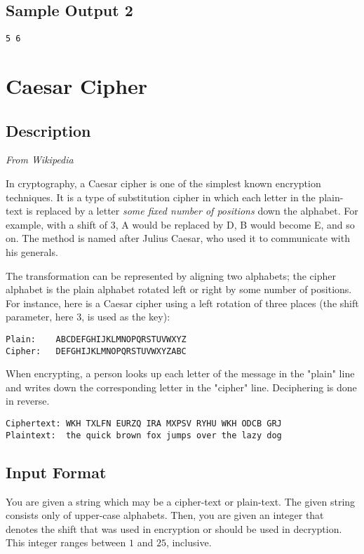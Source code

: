 \subsection*{Sample Output 2}
\begin{verbatim}
5 6
\end{verbatim}



\newpage

\section{Caesar Cipher}
\subsection*{Description}
\textit{From Wikipedia} 

In cryptography, a Caesar cipher is one of the simplest known encryption techniques.  It is a type of substitution cipher in which each letter in the plain-text is replaced by a letter \textit{some fixed number of positions} down the alphabet. For example, with a shift of $3$, A would be replaced by D, B would become E, and so on. The method is named after Julius Caesar, who used it to communicate with his generals.


The transformation can be represented by aligning two alphabets; the cipher alphabet is the plain alphabet rotated left or right by some number of positions. For instance, here is a Caesar cipher using a left rotation of three places (the shift parameter, here 3, is used as the key):
\begin{verbatim}
Plain:    ABCDEFGHIJKLMNOPQRSTUVWXYZ
Cipher:   DEFGHIJKLMNOPQRSTUVWXYZABC
\end{verbatim}

When encrypting, a person looks up each letter of the message in the "plain" line and writes down the corresponding letter in the "cipher" line. Deciphering is done in reverse.
\begin{verbatim}
Ciphertext: WKH TXLFN EURZQ IRA MXPSV RYHU WKH ODCB GRJ
Plaintext:  the quick brown fox jumps over the lazy dog
\end{verbatim}

\subsection*{Input Format}
You are given a string which may be a cipher-text or plain-text. The given string consists only of upper-case alphabets.  Then, you are given an integer that denotes the shift that was used in encryption or should be used in decryption.  This integer ranges between $1$ and $25$, inclusive. 

